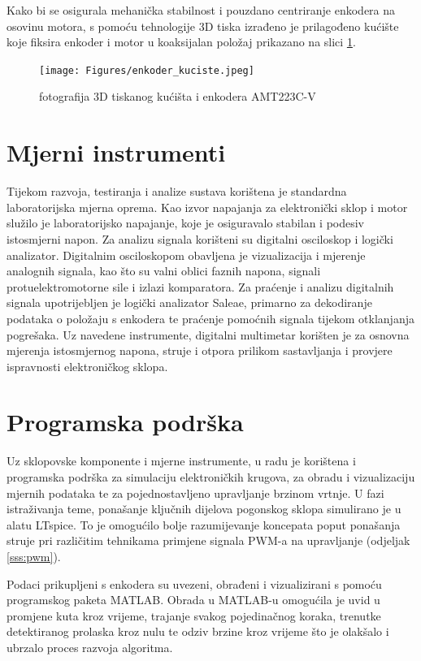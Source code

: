 \documentclass[diplomskirad, upload]{fer}
\begin{document}
Kako bi se osigurala mehanička stabilnost i pouzdano centriranje enkodera na
osovinu motora, s pomoću tehnologije 3D tiska izrađeno je prilagođeno kućište
koje fiksira enkoder i motor u koaksijalan položaj prikazano na slici
\ref{fig:enkoder_kuciste}.

\begin{figure}[h!]
	\centering
	\texttt{[image: Figures/enkoder\_kuciste.jpeg]}
	\caption{fotografija 3D tiskanog kućišta i enkodera AMT223C-V}
	\label{fig:enkoder_kuciste}
\end{figure}

\section{Mjerni instrumenti}
\label{sec:mjerni_instrumenti}

Tijekom razvoja, testiranja i analize sustava korištena je standardna
laboratorijska mjerna oprema. Kao izvor napajanja za elektronički sklop i motor
služilo je laboratorijsko napajanje, koje je osiguravalo stabilan i podesiv
istosmjerni napon. Za analizu signala korišteni su digitalni osciloskop i
logički analizator. Digitalnim osciloskopom obavljena je vizualizacija i
mjerenje analognih signala, kao što su valni oblici faznih napona, signali
protuelektromotorne sile i izlazi komparatora. Za praćenje i analizu digitalnih
signala upotrijebljen je logički analizator Saleae, primarno za dekodiranje
podataka o položaju s enkodera te praćenje pomoćnih signala tijekom otklanjanja
pogrešaka. Uz navedene instrumente, digitalni multimetar korišten je za osnovna
mjerenja istosmjernog napona, struje i otpora prilikom sastavljanja i provjere
ispravnosti elektroničkog sklopa.

\section{Programska podrška}
\label{sec:programska_podrska}

Uz sklopovske komponente i mjerne instrumente, u radu je korištena i programska
podrška za simulaciju elektroničkih krugova, za obradu i vizualizaciju mjernih
podataka te za pojednostavljeno upravljanje brzinom vrtnje. U fazi istraživanja
teme, ponašanje ključnih dijelova pogonskog sklopa simulirano je u alatu
LTspice. To je omogućilo bolje razumijevanje koncepata poput ponašanja struje
pri različitim tehnikama primjene signala PWM-a na upravljanje (odjeljak
\ref{sss:pwm}).

Podaci prikupljeni s enkodera su uvezeni, obrađeni i vizualizirani s pomoću
programskog paketa MATLAB. Obrada u MATLAB-u omogućila je uvid u promjene kuta
kroz vrijeme, trajanje svakog pojedinačnog koraka, trenutke detektiranog
prolaska kroz nulu te odziv brzine kroz vrijeme što je olakšalo i ubrzalo
proces razvoja algoritma.
\end{document}
